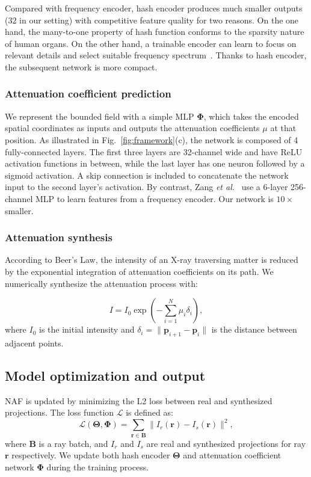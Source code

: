 \documentclass[runningheads]{llncs}
\begin{document}
Compared with frequency encoder, hash encoder produces much smaller outputs ($32$ in our setting) with competitive feature quality for two reasons. On the one hand, the many-to-one property of hash function conforms to the sparsity nature of human organs. On the other hand, a trainable encoder can learn to focus on relevant details and select suitable frequency spectrum~\cite{mueller2022instant}. Thanks to hash encoder, the subsequent network 
is more compact.


\subsubsection{Attenuation coefficient prediction}
We represent the bounded field with a simple MLP $\mathbf{\Phi}$, which takes the encoded spatial coordinates as inputs and outputs the attenuation coefficients $\mu$ at that position. As illustrated in Fig.~\ref{fig:framework}(c), the network is composed of 4 fully-connected layers. The first three layers are 32-channel wide and have ReLU activation functions in between, while the last layer has one neuron followed by a sigmoid activation. A skip connection is included to concatenate the network input to the second layer's activation. By contrast, Zang \textit{et al.}~\cite{zang2021intratomo} use a 6-layer 256-channel MLP to learn features from a frequency encoder. Our network is $10\times$ smaller.


\subsubsection{Attenuation synthesis}
According to Beer's Law, the intensity of an X-ray traversing matter is reduced by the exponential integration of attenuation coefficients on its path. We numerically synthesize the attenuation process with:

\begin{equation}
    I=I_{0}\exp(-\sum_{i=1}^{N}\mu_{i}\delta_{i}),
\end{equation}
where $I_{0}$ is the initial intensity and $\delta_{i}=\|\mathbf{p}_{i+1}-\mathbf{p}_{i}\|$ is the distance between adjacent points.


\subsection{Model optimization and output}
NAF is updated by minimizing the L2 loss between real and synthesized projections. The loss function $\mathcal{L}$ is defined as:
\begin{equation}
   \mathcal{L}(\mathbf{\Theta},\mathbf{\Phi}) = \sum_{\mathbf{r}\in\mathbf{B}}\|I_{r}(\mathbf{r})-I_{s}(\mathbf{r})\|^2,
\end{equation}
where $\mathbf{B}$ is a ray batch, and $I_{r}$ and $I_{s}$ are real and synthesized projections for ray $\mathbf{r}$ respectively. We update both hash encoder $\mathbf{\Theta}$ and attenuation coefficient network $\mathbf{\Phi}$ during the training process.
\end{document}
